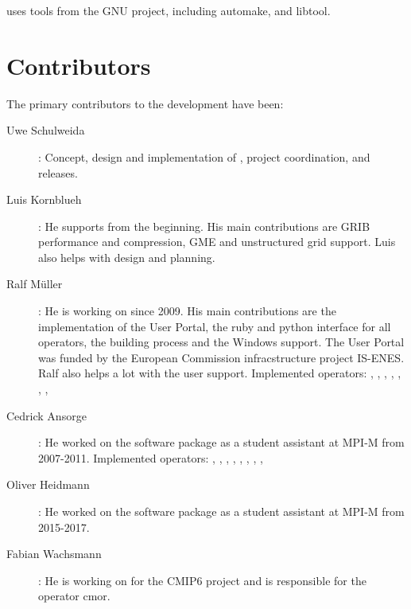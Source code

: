 {\CDO} uses tools from the GNU project, including automake, and libtool. 

\section{Contributors}

The primary contributors to the {\CDO} development have been: 

\begin{description}
\item[Uwe Schulweida]: Concept, design and implementation of {\CDO}, project coordination, and releases.

\item[Luis Kornblueh]: He supports {\CDO} from the beginning. 
His main contributions are GRIB performance and compression, GME and unstructured grid support.
Luis also helps with design and planning.

\item[Ralf M\"uller]: He is working on {\CDO} since 2009. 
His main contributions are the implementation of the User Portal, 
the ruby and python interface for all {\CDO} operators, the building process and the Windows support.
The {\CDO} User Portal was funded by the European Commission infracstructure project IS-ENES.
Ralf also helps a lot with the user support.
Implemented operators: {}, {}, {}, {},
{}, {}, {}, {}

\item[Cedrick Ansorge]: He worked on the {\CDO} software package as a student assistant at MPI-M from 2007-2011.
Implemented operators: {}, {}, {}, {},
 {}, {}, {}, {}, {}

\item[Oliver Heidmann]: He worked on the {\CDO} software package as a student assistant at MPI-M from 2015-2017.

\item[Fabian Wachsmann]: He is working on {\CDO} for the CMIP6 project and is responsible for the operator cmor.


\end{description}
